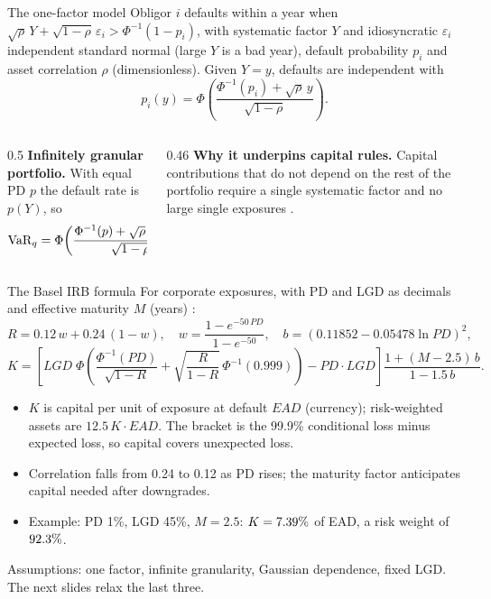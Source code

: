 \documentclass[aspectratio=169,10pt]{beamer}
\begin{document}
\begin{frame}{The one-factor model}
  \small
  Obligor $i$ defaults within a year when $\sqrt\rho\,Y + \sqrt{1-\rho}\,\varepsilon_i > \Phi^{-1}(1 - p_i)$, with systematic factor $Y$ and idiosyncratic $\varepsilon_i$ independent standard normal (large $Y$ is a bad year), default probability $p_i$ and asset correlation $\rho$ (dimensionless). Given $Y = y$, defaults are independent with
  \[ p_i(y) = \Phi\!\left(\frac{\Phi^{-1}(p_i) + \sqrt\rho\,y}{\sqrt{1-\rho}}\right). \]
  \begin{columns}[T]
    \begin{column}{0.5\textwidth}
      \textbf{Infinitely granular portfolio.} With equal PD $p$ the default rate is $p(Y)$, so
      \[ \mathrm{VaR}_q = \Phi\!\left(\frac{\Phi^{-1}(p) + \sqrt\rho\,\Phi^{-1}(q)}{\sqrt{1-\rho}}\right). \]
    \end{column}
    \begin{column}{0.46\textwidth}
      \textbf{Why it underpins capital rules.} Capital contributions that do not depend on the rest of the portfolio require a single systematic factor and no large single exposures \citep{gordy2003risk}.
    \end{column}
  \end{columns}
\end{frame}

\begin{frame}{The Basel IRB formula}
  \small
  For corporate exposures, with PD and LGD as decimals and effective maturity $M$ (years) \citep{bcbs2005irb}:
  \[ R = 0.12\,w + 0.24\,(1 - w), \quad w = \frac{1 - e^{-50\,PD}}{1 - e^{-50}}, \quad b = (0.11852 - 0.05478\ln PD)^2, \]
  \[ K = \left[LGD\;\Phi\!\left(\frac{\Phi^{-1}(PD)}{\sqrt{1-R}} + \sqrt{\frac{R}{1-R}}\,\Phi^{-1}(0.999)\right) - PD\cdot LGD\right]\frac{1 + (M - 2.5)\,b}{1 - 1.5\,b}. \]
  \begin{itemize}
    \item $K$ is capital per unit of exposure at default $EAD$ (currency); risk-weighted assets are $12.5\,K\cdot EAD$. The bracket is the 99.9\% conditional loss minus expected loss, so capital covers unexpected loss.
    \item Correlation falls from 0.24 to 0.12 as PD rises; the maturity factor anticipates capital needed after downgrades.
    \item Example: PD 1\%, LGD 45\%, $M = 2.5$: $K = 7.39\%$ of EAD, a risk weight of $92.3\%$.
  \end{itemize}
  Assumptions: one factor, infinite granularity, Gaussian dependence, fixed LGD. The next slides relax the last three.
\end{frame}
\end{document}
